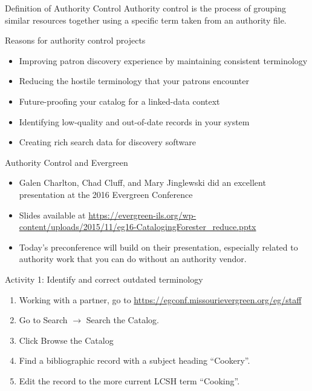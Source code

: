 \documentclass{beamer}
\begin{document}
\begin{frame}{Definition of Authority Control}
Authority control is the process of grouping
similar resources together using a specific term taken from
an authority file.

\end{frame}


\begin{frame}{Reasons for authority control projects}
\begin{itemize}
 \item Improving patron discovery experience by maintaining consistent terminology
 \item Reducing the hostile terminology that your patrons encounter
 \item Future-proofing your catalog for a linked-data context
 \item Identifying low-quality and out-of-date records in your system
 \item Creating rich search data for discovery software
\end{itemize}

\end{frame}

\begin{frame}{Authority Control and Evergreen}
\begin{itemize}
 \item Galen Charlton, Chad Cluff, and Mary Jinglewski did an excellent presentation at the 2016 Evergreen Conference
 \item Slides available at \url{https://evergreen-ils.org/wp-content/uploads/2015/11/eg16-CatalogingForester_reduce.pptx}
 \item Today's preconference will build on their presentation, especially related to 
 authority work that you can do without an authority vendor.
\end{itemize}

\end{frame}



\begin{frame}{Activity 1: Identify and correct outdated terminology}
\begin{enumerate}
 \item Working with a partner, go to \url{https://egconf.missourievergreen.org/eg/staff}
 \item Go to Search $\rightarrow$ Search the Catalog.
 \item Click Browse the Catalog
 \item Find a bibliographic record with a subject heading ``Cookery''.
 \item Edit the record to the more current LCSH term ``Cooking''.
\end{enumerate}

\end{frame}
\end{document}
